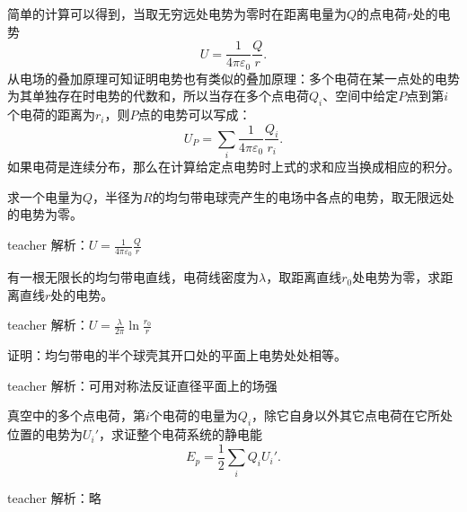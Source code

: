 简单的计算可以得到，当取无穷远处电势为零时在距离电量为$Q$的点电荷$r$处的电势
\[
U = \frac{1}{4\pi \varepsilon_0}\frac{Q}{r}.
\]
从电场的叠加原理可知证明电势也有类似的叠加原理：多个电荷在某一点处的电势为其单独存在时电势的代数和，所以当存在多个点电荷$Q_i$、空间中给定$P$点到第$i$个电荷的距离为$r_i$，则$P$点的电势可以写成：
\begin{equation}
U_P = \sum_i \frac{1}{4\pi \varepsilon_0}\frac{Q_i}{r_i}.
\end{equation}
如果电荷是连续分布，那么在计算给定点电势时上式的求和应当换成相应的积分。



\begin{example}
求一个电量为$Q$，半径为$R$的均匀带电球壳产生的电场中各点的电势，取无限远处的电势为零。
\begin{taggedblock}{teacher}
\newline
解析：$U=\frac{1}{4\pi\varepsilon_0}\frac{Q}{r}$
\end{taggedblock}
\end{example}

\begin{example}
有一根无限长的均匀带电直线，电荷线密度为$\lambda$，取距离直线$r_0$处电势为零，求距离直线$r$处的电势。
\begin{taggedblock}{teacher}
\newline
解析：$U=\frac{\lambda}{2\pi}\ln{\frac{r_0}{r}}$
\end{taggedblock}
\end{example}

\begin{example}
证明：均匀带电的半个球壳其开口处的平面上电势处处相等。
\begin{taggedblock}{teacher}
\newline
解析：可用对称法反证直径平面上的场强
\end{taggedblock}
\end{example}

\begin{example}
真空中的多个点电荷，第$i$个电荷的电量为$Q_i$，除它自身以外其它点电荷在它所处位置的电势为$U_i'$，求证整个电荷系统的静电能
\[E_p = \frac{1}{2}\sum_i Q_iU_i'.\]

\begin{taggedblock}{teacher}
\noindent
解析：略
\end{taggedblock}
\end{example}

